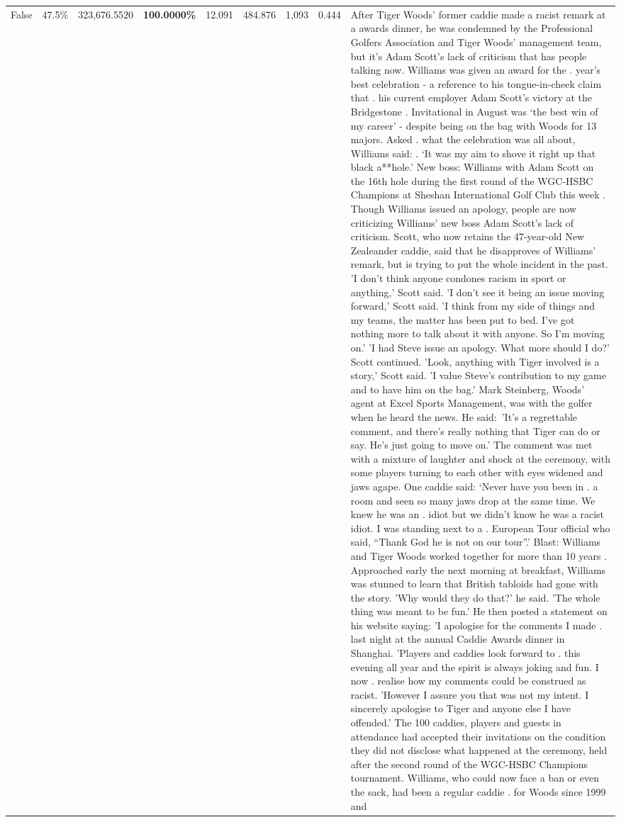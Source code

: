 \begin{table}[H]
\begin{tabular}{lllrlllll}
False & 47.5\% & 323,676.5520 & \bfseries \color{red} 100.0000\% & 12.091 & 484.876 & 1,093 & 0.444 & After Tiger Woods' former caddie made a racist remark at a awards dinner, he was condemned by the Professional Golfers Association and Tiger Woods' management team, but it's Adam Scott's lack of criticism that has people talking now. Williams was given an award for the . year’s best celebration - a reference to his tongue-in-cheek claim that . his current employer Adam Scott’s victory at the Bridgestone . Invitational in August was ‘the best win of my career’ - despite being on the bag with Woods for 13 majors. Asked . what the celebration was all about, Williams said: . ‘It was my aim to shove it right up that black a**hole.’ New boss: Williams with Adam Scott  on the 16th hole during the first round of the WGC-HSBC Champions at Sheshan International Golf Club this week . Though Williams issued an apology, people are now criticizing Williams' new boss Adam Scott's lack of criticism. Scott, who now retains the 47-year-old New Zealeander caddie, said that he disapproves of Williams' remark, but is trying to put the whole incident in the past. 'I don't think anyone condones racism in sport or anything,' Scott said. 'I don't see it being an issue moving forward,' Scott said. 'I think from my side of things and my teams, the matter has been put to bed. I've got nothing more to talk about it with anyone. So I'm moving on.' 'I had Steve issue an apology. What more should I do?' Scott continued. 'Look, anything with Tiger involved is a story,' Scott said. 'I value Steve's contribution to my game and to have him on the bag.' Mark Steinberg, Woods' agent at Excel Sports Management, was with the golfer when he heard the news. He said: 'It's a regrettable comment, and there's really nothing that Tiger can do or say. He's just going to move on.' The comment was met with a mixture of laughter and shock at the ceremony, with some players turning to each other with eyes widened and jaws agape. One caddie said: ‘Never have you been in . a room and seen so many jaws drop at the same time. We knew he was an . idiot but we didn’t know he was a racist idiot. I was standing next to a . European Tour official who said, “Thank God he is not on our tour”.’ Blast: Williams and Tiger Woods worked together for more than 10 years . Approached early the next morning at breakfast, Williams was stunned to learn that British tabloids had gone with the story. 'Why would they do that?' he said. 'The whole thing was meant to be fun.' He then posted a statement on his website saying: 'I apologise for the comments I made . last night at the annual Caddie Awards dinner in Shanghai. 'Players and caddies look forward to . this evening all year and the spirit is always joking and fun. I now . realise how my comments could be construed as racist. 'However I assure you that was not my intent. I sincerely apologise to Tiger and anyone else I have offended.' The 100 caddies, players and guests in attendance had accepted their invitations on the condition they did not disclose what happened at the ceremony, held after the second round of the WGC-HSBC Champions tournament. Williams, who could now face a ban or even the sack, had been a regular caddie . for Woods since 1999 and 
\end{tabular}
\end{table}
